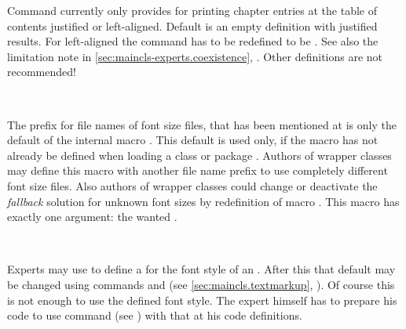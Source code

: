 \begin{Declaration}
\end{Declaration}
%
Command  currently only provides for printing
chapter entries at the table of contents justified or left-aligned. Default is
an empty definition with justified results. For left-aligned the command has
to be redefined to be
. See
also the limitation note in \autoref{sec:maincls-experts.coexistence},
. Other definitions are
not recommended!%
%



\begin{Declaration}
  \\
\end{Declaration}
%
%
The prefix  for file names of font size files, that has been
mentioned at
 is only the default of the
internal macro . This
default is used only, if the macro has not already be defined when loading a
\KOMAScript{} class or package . Authors of wrapper classes
may define this macro with another file name prefix to use completely
different font size files. Also authors of wrapper classes
could change or deactivate the \emph{fallback} solution for unknown font sizes
by redefinition of macro
. This macro has
exactly one argument: the wanted .%
%
%
%

\begin{Declaration}
                     \\
\end{Declaration}
%
%
Experts may use  to define a  for the font
style of an . After this that default may be changed using
commands  and  (see
\autoref{sec:maincls.textmarkup},
). Of course this is not enough to
use the defined font style. The expert himself has to prepare his code to use
command
 (see
) with that  at his
code definitions.

